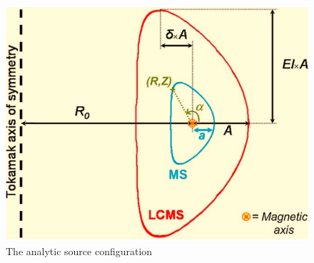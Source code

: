 \documentclass[12pt, letterpaper]{elsarticle}
\begin{document}
\begin{figure}[h!]
  \centering
  \includegraphics[scale=0.2]{../plots/Analytic_source.png}
  \caption{The analytic source configuration}
  \label{fig:Analytic_source}
\end{figure}
\end{document}
